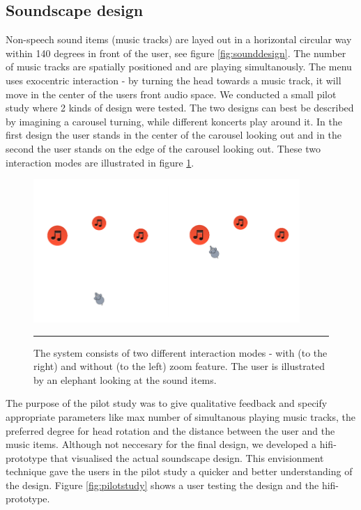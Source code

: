 \subsection{Soundscape design}
Non-speech sound items (music tracks) are layed out in a horizontal circular way within 140 degrees in front of the user, see figure \ref{fig:sounddesign}. The number of music tracks are spatially positioned and are playing simultanously. The menu uses exocentric interaction - by turning the head towards a music track, it will move in the center of the users front audio space. We conducted a small pilot study where 2 kinds of design were tested. The two designs can best be described by imagining a carousel turning, while different koncerts play around it. In the first design the user stands in the center of the carousel looking out and in the second the user stands on the edge of the carousel looking out. These two interaction modes are illustrated in figure \ref{fig:interactionmodes}.

\begin{figure}[t]
	\centering
		\includegraphics[width=0.9\textwidth,height=\textheight,keepaspectratio]{./Figures/interactionmodes.png}
		\rule{35em}{0.5pt}
	\caption[Interaction modes]{The system consists of two different interaction modes - with (to the right) and without (to the left) zoom feature. The user is illustrated by an elephant looking at the sound items.}
	\label{fig:interactionmodes}
\end{figure}

The purpose of the pilot study was to give qualitative feedback and specify appropriate parameters like max number of simultanous playing music tracks, the preferred degree for head rotation and the distance between the user and the music items. Although not neccesary for the final design, we developed a hifi-prototype \cite{benyon_designing_2010} that visualised the actual soundscape design. This envisionment technique gave the users in the pilot study a quicker and better understanding of the design. Figure \ref{fig:pilotstudy} shows a user testing the design and the hifi-prototype.

